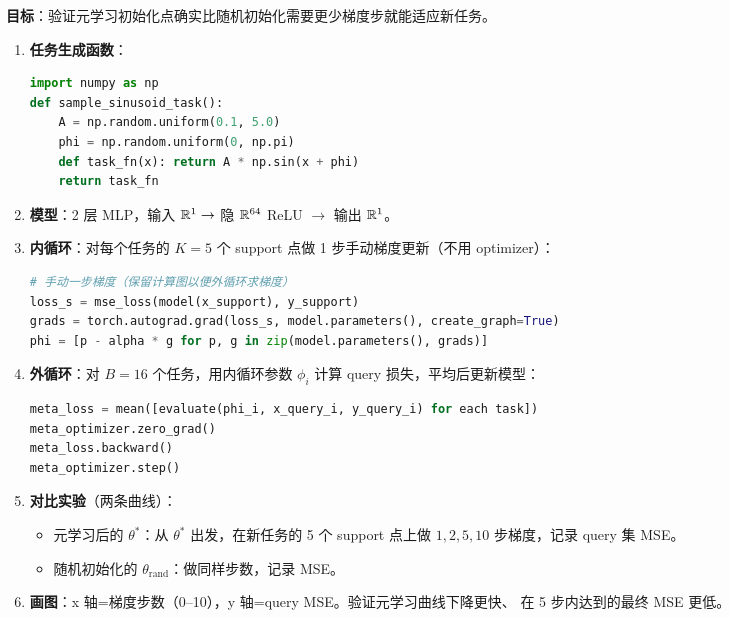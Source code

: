 \begin{labbox}[title=Lab 3：用 PyTorch 实现 FOMAML，在正弦波族上验证元学习]
\textbf{目标}：验证元学习初始化点确实比随机初始化需要更少梯度步就能适应新任务。

\begin{enumerate}
  \item \textbf{任务生成函数}：
\begin{lstlisting}[language=Python]
import numpy as np
def sample_sinusoid_task():
    A = np.random.uniform(0.1, 5.0)
    phi = np.random.uniform(0, np.pi)
    def task_fn(x): return A * np.sin(x + phi)
    return task_fn
\end{lstlisting}

  \item \textbf{模型}：2 层 MLP，输入 $\mathbb{R}^1 \to$ 隐 $\mathbb{R}^{64}$ ReLU $\to$ 输出 $\mathbb{R}^1$。

  \item \textbf{内循环}：对每个任务的 $K=5$ 个 support 点做 1 步手动梯度更新（不用 optimizer）：
\begin{lstlisting}[language=Python]
# 手动一步梯度（保留计算图以便外循环求梯度）
loss_s = mse_loss(model(x_support), y_support)
grads = torch.autograd.grad(loss_s, model.parameters(), create_graph=True)
phi = [p - alpha * g for p, g in zip(model.parameters(), grads)]
\end{lstlisting}

  \item \textbf{外循环}：对 $B=16$ 个任务，用内循环参数 $\phi_i$ 计算 query 损失，平均后更新模型：
\begin{lstlisting}[language=Python]
meta_loss = mean([evaluate(phi_i, x_query_i, y_query_i) for each task])
meta_optimizer.zero_grad()
meta_loss.backward()
meta_optimizer.step()
\end{lstlisting}

  \item \textbf{对比实验}（两条曲线）：
    \begin{itemize}
      \item 元学习后的 $\theta^*$：从 $\theta^*$ 出发，在新任务的 5 个 support 点上做 $1, 2, 5, 10$ 步梯度，记录 query 集 MSE。
      \item 随机初始化的 $\theta_\text{rand}$：做同样步数，记录 MSE。
    \end{itemize}

  \item \textbf{画图}：x 轴=梯度步数（0--10），y 轴=query MSE。验证元学习曲线下降更快、
        在 5 步内达到的最终 MSE 更低。
\end{enumerate}
\end{labbox}


